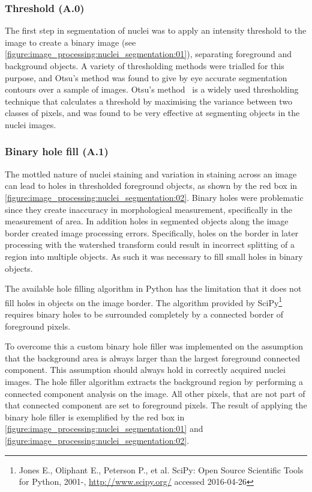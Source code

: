 \subsubsection{Threshold (A.0)}
The first step in segmentation of nuclei was to apply an intensity threshold to the image to create a binary image (see \autoref{figure:image_processing:nuclei_segmentation:01}), separating foreground and background objects. A variety of thresholding methods were trialled for this purpose, and Otsu's method was found to give by eye accurate segmentation contours over a sample of images. Otsu's method~\cite{Otsu1979} is a widely used thresholding technique that calculates a threshold by maximising the variance between two classes of pixels, and was found to be very effective at segmenting objects in the nuclei images.

\subsubsection{Binary hole fill (A.1)}
The mottled nature of nuclei staining and variation in staining across an image can lead to holes in thresholded foreground objects, as shown by the red box in \autoref{figure:image_processing:nuclei_segmentation:02}. Binary holes were problematic since they create inaccuracy in morphological measurement, specifically in the measurement of area. In addition holes in segmented objects along the image border created image processing errors. Specifically, holes on the border in later processing with the watershed transform could result in incorrect splitting of a region into multiple objects. As such it was necessary to fill small holes in binary objects.

The available hole filling algorithm in Python has the limitation that it does not fill holes in objects on the image border. The algorithm provided by SciPy\footnote{Jones E., Oliphant E., Peterson P., et al. SciPy: Open Source Scientific Tools for Python, 2001-, \url{http://www.scipy.org/} accessed 2016-04-26} requires binary holes to be surrounded completely by a connected border of foreground pixels.

To overcome this a custom binary hole filler was implemented on the assumption that the background area is always larger than the largest foreground connected component. This assumption should always hold in correctly acquired nuclei images. The hole filler algorithm extracts the background region by performing a connected component analysis on the image. All other pixels, that are not part of that connected component are set to foreground pixels. The result of applying the binary hole filler is exemplified by the red box in \autoref{figure:image_processing:nuclei_segmentation:01} and \autoref{figure:image_processing:nuclei_segmentation:02}.

